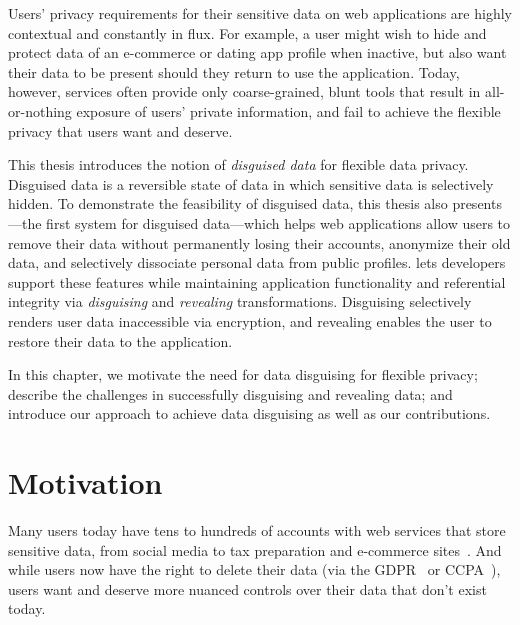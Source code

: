 Users' privacy requirements for their sensitive data on web applications are
highly contextual and constantly in flux. For example, a user might wish to hide
and protect data of an e-commerce or dating app profile when inactive, but also
want their data to be present should they return to use the application. 
%
Today, however, services often provide only coarse-grained, blunt tools that
result in all-or-nothing exposure of users' private information, and fail to
achieve the flexible privacy that users want and deserve.
%

%
This thesis introduces the notion of \emph{disguised data} for flexible data
privacy. Disguised data is a reversible state of data in which sensitive data is
selectively hidden.
%
To demonstrate the feasibility of disguised data, this thesis also presents
\sys---the first system for disguised data---which helps web applications allow users
to remove their data without permanently losing their accounts, anonymize their
old data, and selectively dissociate personal data from public profiles.
%
\sys lets developers support these features while maintaining application
functionality and referential integrity via \emph{disguising} and \emph{revealing}
transformations.
%
Disguising selectively renders user data inaccessible via encryption, and
revealing enables the user to restore their data to the application.
%
%

%
In this chapter, we motivate the need for data disguising for flexible
privacy; describe the challenges in successfully disguising and revealing data;
and introduce our approach to achieve data disguising as well as our
contributions.

\section{Motivation} 
Many users today have tens to hundreds of accounts with web services that store
sensitive data, from social media to tax preparation and e-commerce
sites~\cite{tens,hundreds,password_life_cycle}.
%
And while users now have the right to delete their data (via \eg the
GDPR~\cite{eu:gdpr} or CCPA~\cite{ccpa}), users want and deserve more nuanced
controls over their data that don't exist today.
%

